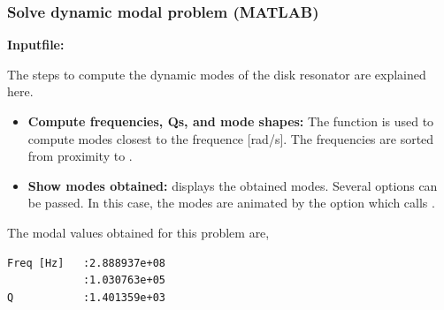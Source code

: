 \clearpage
\subsubsection*{Solve dynamic modal problem (MATLAB)}
\begin{flushleft}
  \textbf{Inputfile:}
  \\
\end{flushleft}
\hspace{1in}
{\footnotesize
{}
}

\clearpage
The steps to compute the dynamic modes of the disk resonator are 
explained here. 

\begin{itemize}

  \item{\textbf{Compute frequencies, Qs, and mode shapes:}}
  The function  is used to compute 
  modes closest to the frequence [rad/s]. The frequencies
  are sorted from proximity to .

  \item{\textbf{Show modes obtained:}}
   displays the obtained modes. Several options
  can be passed. In this case, the modes are animated by
  the  option which calls . 

\end{itemize}

The modal values obtained for this problem are,
\begin{verbatim}
Freq [Hz]   :2.888937e+08
            :1.030763e+05
Q           :1.401359e+03
\end{verbatim}

